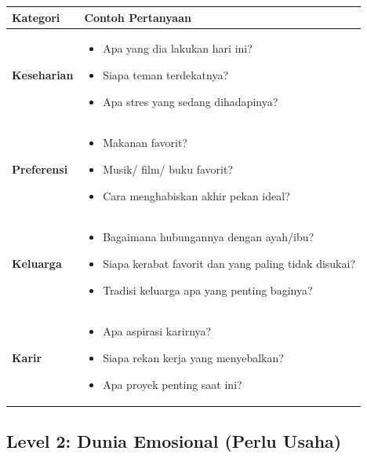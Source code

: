 \begin{center}
\renewcommand{\arraystretch}{1.4}
\begin{tabular}{|>{\raggedright}p{5cm}|>{\raggedright\arraybackslash}p{10cm}|}
\hline
\rowcolor{primary!20}
\textbf{Kategori} & \textbf{Contoh Pertanyaan} \\
\hline
\textbf{Keseharian} & 
\begin{itemize}[leftmargin=*, itemsep=0.05cm]
    \item Apa yang dia lakukan hari ini?
    \item Siapa teman terdekatnya?
    \item Apa stres yang sedang dihadapinya?
\end{itemize} \\
\hline
\textbf{Preferensi} & 
\begin{itemize}[leftmargin=*, itemsep=0.05cm]
    \item Makanan favorit?
    \item Musik/ film/ buku favorit?
    \item Cara menghabiskan akhir pekan ideal?
\end{itemize} \\
\hline
\textbf{Keluarga} & 
\begin{itemize}[leftmargin=*, itemsep=0.05cm]
    \item Bagaimana hubungannya dengan ayah/ibu?
    \item Siapa kerabat favorit dan yang paling tidak disukai?
    \item Tradisi keluarga apa yang penting baginya?
\end{itemize} \\
\hline
\textbf{Karir} & 
\begin{itemize}[leftmargin=*, itemsep=0.05cm]
    \item Apa aspirasi karirnya?
    \item Siapa rekan kerja yang menyebalkan?
    \item Apa proyek penting saat ini?
\end{itemize} \\
\hline
\end{tabular}
\end{center}

\subsection{Level 2: Dunia Emosional (Perlu Usaha)}


